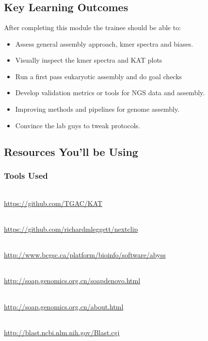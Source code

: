 
\chapter{\moduleTitle}
\newpage


\section{Key Learning Outcomes}

After completing this module the trainee should be able to:
\begin{itemize}
  \item Assess general assembly approach, kmer spectra and biases.
  \item Visually inspect the kmer spectra and KAT plots
  \item Run a first pass eukaryotic assembly and do goal checks 
  \item Develop validation metrics or tools for NGS data and assembly.
  \item Improving methods and pipelines for genome assembly.
  \item Convince the lab guys to tweak protocols.
\end{itemize}

\section{Resources You'll be Using}
 
\subsection{Tools Used}
\begin{description}[style=multiline,labelindent=0cm,align=left,leftmargin=0.5cm]
  \item[Kmer Analysis Tool kit]\hfill\\
  	\url{https://github.com/TGAC/KAT}
  \item[Nextclip]\hfill\\
  	\url{https://github.com/richardmleggett/nextclip}
  \item[Abyss]\hfill\\
  	\url{http://www.bcgsc.ca/platform/bioinfo/software/abyss}
  \item[Soap Denovo]\hfill\\
  	\url{http://soap.genomics.org.cn/soapdenovo.html}
  \item[SOAPec]\hfill\\
  	\url{http://soap.genomics.org.cn/about.html}
  \item[BLAST]\hfill\\
  	\url{http://blast.ncbi.nlm.nih.gov/Blast.cgi}
\end{description}

